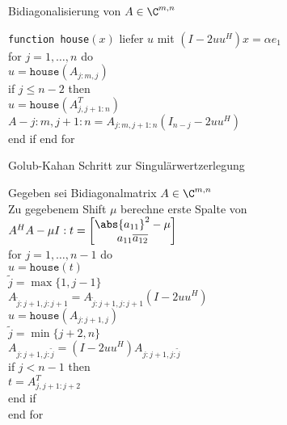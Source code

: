\begin{karte}{Bidiagonalisierung von \(A\in \C^{m,n}\)}
    \begin{tabbing}
        { \texttt{function house}\((x)\) liefer \(u\) mit \((I - 2 u u^H)x = \alpha e_1\)} \\
        for \= \( j = 1,\ldots,n \) do \\
        \> \(u = \texttt{house}(A_{j:m, j})\) \\
        \> if \= \(j \leq n-2\) then \\
        \> \> \(u = \texttt{house}(A_{j,j+1:n}^T)\) \\
        \> \> \( A-{j:m, j+1:n} = A_{j:m,j+1:n}(I_{n-j} - 2 u u^H) \) \\
        \> end if 
        end for
    \end{tabbing}
\end{karte}

\begin{karte}{Golub-Kahan Schritt zur Singulärwertzerlegung}
    \begin{tabbing}
        Gegeben sei Bidiagonalmatrix \(A \in \C^{m,n}\) \\
        Zu gegebenem Shift \(\mu\) berechne erste Spalte von \(A^H A - \mu I: t = \left[ \begin{matrix}
            \abs{a_{11}}^2 - \mu \\ a_{11} \overline{a_{12}}
        \end{matrix} \right]\) \\
        for \= \( j = 1 ,\ldots,n-1 \) do \\
        \> \(u = \texttt{house}(t)\) \\
        \> \( \tilde{j} = \max\{1, j-1\} \) \\
        \> \( A_{\tilde{j}:j+1, j:j+1} = A_{\tilde{j}:j+1, j:j+1}(I - 2 u u^H) \) \\
        \> \( u = \texttt{house}(A_{j:j+1, j}) \) \\
        \> \( \tilde{j} = \min\{j+2, n\} \) \\
        \> \( A_{j:j+1, j:\tilde{j}} = (I - 2 u u^H) A_{j:j+1, j:\tilde{j}} \) \\
        \> if \=\(j < n-1\) then \\
        \> \> \( t = A_{j,j+1:j+2}^T \) \\
        \> end if \\
        end for
    \end{tabbing}
\end{karte}

